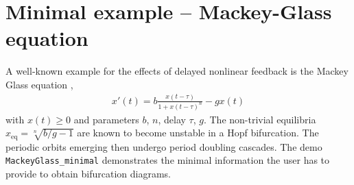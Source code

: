 \documentclass[10pt]{scrartcl}
\newcommand{\DDEBIFCODE}{\textsc{DDE-BIFTOOL}}
\newcommand{\blist}[1]{\mbox{\lstinline!#1!}}
\begin{document}


% 
% 

\section{Minimal example -- Mackey-Glass equation}
\label{sec:minimal}
A well-known example for the effects of delayed nonlinear feedback is the Mackey Glass equation \cite{glass1979pathological,glass2010mackey},
\begin{align}
  \label{eq:MG}x'(t)=b\frac{x(t-\tau)}{1+x(t-\tau)^n}-gx(t)
\end{align}
with $x(t)\geq0$ and parameters $b$, $n$, delay $\tau$, $g$. The
non-trivial equilibria $x_\mathrm{eq}=\sqrt[n]{b/g-1}$ are known to
become unstable in a Hopf bifurcation. The periodic orbits emerging
then undergo period doubling cascades. The
demo \blist{MackeyGlass_minimal} demonstrates the minimal information
the user has to provide to obtain bifurcation diagrams.
\end{document}
